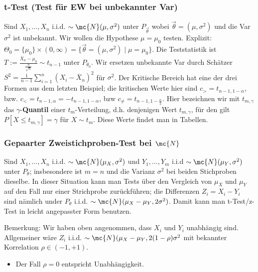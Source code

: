\subsubsection{t-Test (Test für EW bei unbekannter Var)}
Sind $X_1, \dots, X_n$ i.i.d. $\sim \mc{N}(\mu, \sigma^2)$ unter $P_{\overrightarrow{\theta}}$ wobei $\overrightarrow{\theta} = (\mu, \sigma^2)$ und die Var $\sigma^2$ ist unbekannt. Wir wollen die Hypothese $\mu = \mu_0$ testen. Explizit: $\Theta_0 = \{\mu_0\} \times (0, \infty) = \{\overrightarrow{\theta} = (\mu, \sigma^2) \mid \mu = \mu_0\}$. Die Teststatistik ist $T := \frac{\overline{X}_n - \mu_0}{\frac{S}{\sqrt{n}}} \sim t_{n - 1}$ unter $P_{\theta_0}$. Wir ersetzen unbekannte Var durch Schätzer $S^2 = \frac{1}{n - 1} \sum_{i=1}^{n} (X_i - \overline{X}_n)^2$ für $\sigma^2$.
Der Kritische Bereich hat eine der drei Formen aus dem letzten Beispiel; die kritischen Werte hier sind $c_> = t_{n - 1, 1 - \alpha}$, bzw. $c_< = t_{n - 1, \alpha} = -t_{n - 1, 1 - \alpha}$, bzw $c_{\neq} = t_{n - 1, 1 - \frac{\alpha}{2}}$. Hier bezeichnen wir mit $t_{m, \gamma}$ das $\gamma$-\textbf{Quantil} einer $t_m$-Verteilung, d.h. denjenigen Wert $t_{m, \gamma}$, für den gilt $P[X \le t_{m, \gamma}] = \gamma$ für $X \sim t_m$. Diese Werte findet man in Tabellen.

\subsubsection{Gepaarter Zweistichproben-Test bei $\mc{N}$}
Sind $X_1, \dots, X_n$ i.i.d. $\sim \mc{N}(\mu_X, \sigma^2)$ und $Y_1, \dots, Y_m$ i.i.d $\sim \mc{N}(\mu_Y, \sigma^2)$ unter $P_\theta$; insbesondere ist $m = n$ und die Varianz $\sigma^2$ bei beiden Stichproben dieselbe. In dieser Situation kann man Tests über den Vergleich von $\mu_X$ und $\mu_Y$ auf den Fall nur einer Strichprobe zurückführen; die Differenzen $Z_i = X_i - Y_i$ sind nämlich under $P_\theta$ i.i.d. $\sim \mc{N}(\mu_X - \mu_Y, 2 \sigma^2)$. Damit kann man t-Test/z-Test in leicht angepasster Form benutzen.

Bemerkung: Wir haben oben angenommen, dass $X_i$ und $Y_i$ unabhängig sind. Allgemeiner wäre $Z_i$ i.i.d. $\sim \mc{N}(\mu_X - \mu_Y, 2 (1 - \rho)\sigma^2$ mit bekannter Korrelation $\rho \in (-1, +1)$.
    \begin{itemize}
        \item Der Fall $\rho = 0$ entspricht Unabhängigkeit.
    \end{itemize}

